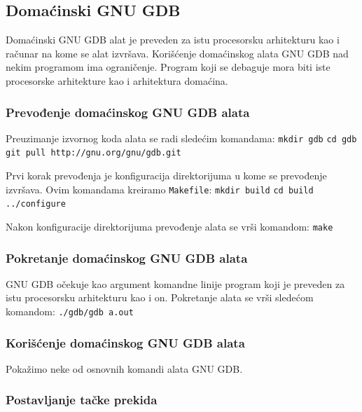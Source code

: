 \documentclass[12pt,oneside]{memoir}
\begin{document}
\subsection{Domaćinski GNU GDB}

Domaćinski GNU GDB alat je preveden za istu procesorsku arhitekturu kao i računar na kome se alat izvršava. Korišćenje domaćinskog alata GNU GDB nad nekim programom ima ograničenje. Program koji se debaguje mora biti iste procesorske arhitekture kao i arhitektura domaćina.

\subsubsection{Prevođenje domaćinskog GNU GDB alata}

Preuzimanje izvornog koda alata se radi sledećim komandama:
\newline
\texttt{mkdir gdb}
\newline
\texttt{cd gdb}
\newline
\texttt{git pull http://gnu.org/gnu/gdb.git}

Prvi korak prevođenja je konfiguracija direktorijuma u kome se prevođenje izvršava. Ovim komandama kreiramo \texttt{Makefile}:
\newline
\texttt{mkdir build}
\newline
\texttt{cd build}
\newline
\texttt{../configure}

Nakon konfiguracije direktorijuma prevođenje alata se vrši komandom:
\newline
\texttt{make}

\subsubsection{Pokretanje domaćinskog GNU GDB alata}

GNU GDB očekuje kao argument komandne linije program koji je preveden za istu procesorsku arhitekturu kao i on. Pokretanje alata se vrši sledećom komandom:
\newline
\texttt{./gdb/gdb a.out}

\subsubsection{Korišćenje domaćinskog GNU GDB alata}

Pokažimo neke od osnovnih komandi alata GNU GDB.

\subsubsection{Postavljanje tačke prekida}
\end{document}
